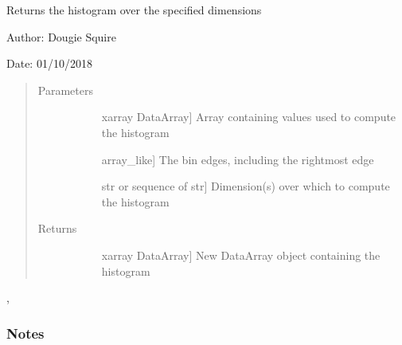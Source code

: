\documentclass[letterpaper,10pt,english]{sphinxmanual}
\begin{document}

\begin{fulllineitems}
\label{\detokenize{utils_doc:utils.histogram}}
Returns the histogram over the specified dimensions

\begin{DUlineblock}{0em}
\item[] Author: Dougie Squire
\item[] Date: 01/10/2018
\end{DUlineblock}
\begin{quote}\begin{description}
\item[{Parameters}] \leavevmode\begin{description}
\item[{}] \leavevmode{[}xarray DataArray{]}
Array containing values used to compute the histogram

\item[{}] \leavevmode{[}array\_like{]}
The bin edges, including the rightmost edge

\item[{}] \leavevmode{[}str or sequence of str{]}
Dimension(s) over which to compute the histogram

\end{description}

\item[{Returns}] \leavevmode\begin{description}
\item[{}] \leavevmode{[}xarray DataArray{]}
New DataArray object containing the histogram

\end{description}

\end{description}\end{quote}




, 


\subsubsection*{Notes}


\end{fulllineitems}
\end{document}
